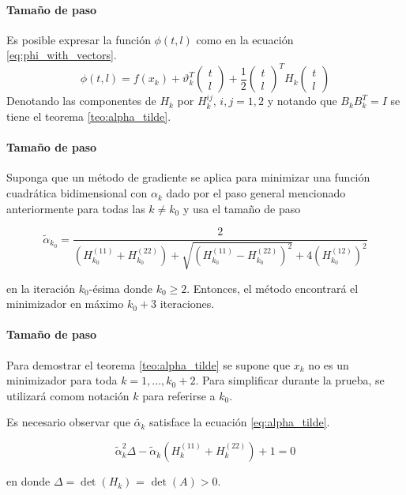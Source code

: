 \begin{frame}{\insertsectionhead}
    \framesubtitle{Tamaño de paso}
    Es posible expresar la función $\phi(t, l)$ como en la ecuación \ref{eq:phi_with_vectors}.
    \begin{equation}
        \phi(t, l) =  f(x_k)+\vartheta_k^T
        \begin{pmatrix}
            t \\l
        \end{pmatrix} +\frac{1}{2}
        \begin{pmatrix}
            t \\l
        \end{pmatrix}^T
        H_k
        \begin{pmatrix}
            t \\l
        \end{pmatrix} \label{eq:phi_with_vectors}
    \end{equation}
    Denotando las componentes de $H_k$ por $H_k^{ij}$, $i,j = 1,2$ y notando que $B_kB^T_k = I$ se tiene el teorema \ref{teo:alpha_tilde}.
\end{frame}

\begin{frame}{\insertsectionhead}
    \framesubtitle{Tamaño de paso}
    \begin{teor}

        Suponga que un método de gradiente se aplica para minimizar una función cuadrá\-tica bidimensional con $\alpha_k$ dado por el paso general mencionado anteriormente para todas las $k\neq k_0$ y usa el tamaño de paso

        \begin{equation*}
            \tilde{\alpha}_{k_0} = \frac{2}{\left(H^{(11)}_{k_0} + H^{(22)}_{k_0}\right)+\sqrt{\left(H^{(11)}_{k_0} - H^{(22)}_{k_0}\right)^2 } + 4\left(H_{k_0}^{(12)}\right)^2}
        \end{equation*}

        en la iteración $k_0$-ésima donde $k_0\geq 2$. Entonces, el método encontrará el minimizador en máximo $k_0+3$ iteraciones.
        \label{teo:alpha_tilde}
    \end{teor}
\end{frame}

\begin{frame}{\insertsectionhead}
    \framesubtitle{Tamaño de paso}
    Para demostrar el teorema \ref{teo:alpha_tilde} se supone que $x_k$ no es un minimizador para toda $k=1, ..., k_0+2$. Para simplificar durante la prueba, se utilizará comom notación $k$ para referirse a $k_0$.

    Es necesario observar que $\tilde{\alpha_k}$ satisface la ecuación \ref{eq:alpha_tilde}.

    \begin{equation}
        \tilde{\alpha}^2_k\Delta-\tilde{\alpha}_k\left(H^{(11)}_k + H_k^{(22)}\right) + 1 = 0
        \label{eq:alpha_tilde}
    \end{equation}

    en donde $\Delta = \det{(H_k)}$ = $\det{(A)}>0$.
\end{frame}

